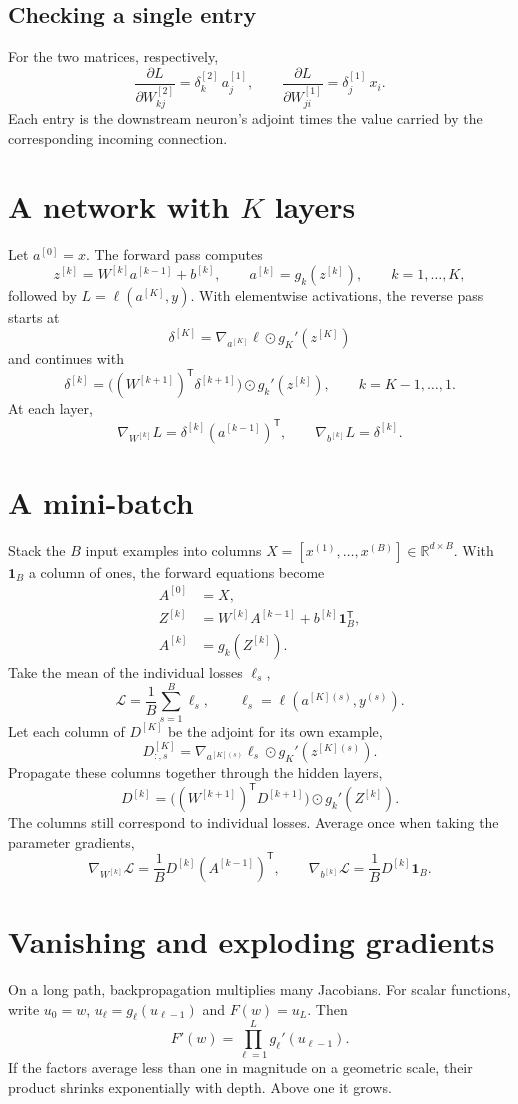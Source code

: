 \documentclass[11pt,a4paper]{article}
\newcommand{\R}{\mathbb{R}}
\newcommand{\T}{\mathsf{T}}
\begin{document}
\subsection{Checking a single entry}
For the two matrices, respectively,
\[
\frac{\partial L}{\partial W^{[2]}_{kj}}=\delta^{[2]}_k\,a^{[1]}_j,
\qquad
\frac{\partial L}{\partial W^{[1]}_{ji}}=\delta^{[1]}_j\,x_i.
\]
Each entry is the downstream neuron's adjoint times the value carried by
the corresponding incoming connection.

\section{A network with $K$ layers}
Let $a^{[0]}=x$. The forward pass computes
\[
z^{[k]}=W^{[k]}a^{[k-1]}+b^{[k]},\qquad
a^{[k]}=g_k(z^{[k]}),\qquad k=1,\ldots,K,
\]
followed by $L=\ell(a^{[K]},y)$. With elementwise activations, the reverse pass starts at
\[
\delta^{[K]}=\nabla_{a^{[K]}}\ell\odot g_K'(z^{[K]})
\]
and continues with
\[
\delta^{[k]}=\big((W^{[k+1]})^\T\delta^{[k+1]}\big)\odot g_k'(z^{[k]}),
\qquad k=K-1,\ldots,1.
\]
At each layer,
\[
\nabla_{W^{[k]}}L=\delta^{[k]}(a^{[k-1]})^\T,\qquad
\nabla_{b^{[k]}}L=\delta^{[k]}.
\]

\section{A mini-batch}
Stack the $B$ input examples into columns
$X=[x^{(1)},\ldots,x^{(B)}]\in\R^{d\times B}$. With $\mathbf{1}_B$
a column of ones, the forward equations become
\begin{align*}
A^{[0]}&=X,\\
Z^{[k]}&=W^{[k]}A^{[k-1]}+b^{[k]}\mathbf{1}_B^\T,\\
A^{[k]}&=g_k(Z^{[k]}).
\end{align*}
Take the mean of the individual losses $\ell_s$,
\[
\mathcal L=\frac1B\sum_{s=1}^B\ell_s,\qquad \ell_s=\ell(a^{[K](s)},y^{(s)}).
\]
Let each column of $D^{[K]}$ be the adjoint for its own example,
\[
D^{[K]}_{:,s}=\nabla_{a^{[K](s)}}\ell_s\odot g_K'(z^{[K](s)}).
\]
Propagate these columns together through the hidden layers,
\[
D^{[k]}=\big((W^{[k+1]})^\T D^{[k+1]}\big)\odot g_k'(Z^{[k]}).
\]
The columns still correspond to individual losses. Average once when taking
the parameter gradients,
\[
\nabla_{W^{[k]}}\mathcal L=\frac1B D^{[k]}(A^{[k-1]})^\T,\qquad
\nabla_{b^{[k]}}\mathcal L=\frac1B D^{[k]}\mathbf{1}_B.
\]

\section{Vanishing and exploding gradients}
On a long path, backpropagation multiplies many Jacobians.
For scalar functions, write $u_0=w$, $u_\ell=g_\ell(u_{\ell-1})$ and $F(w)=u_L$. Then
\[
F'(w)=\prod_{\ell=1}^L g_\ell'(u_{\ell-1}).
\]
If the factors average less than one in magnitude on a geometric scale,
their product shrinks exponentially with depth. Above one it grows.
\end{document}
